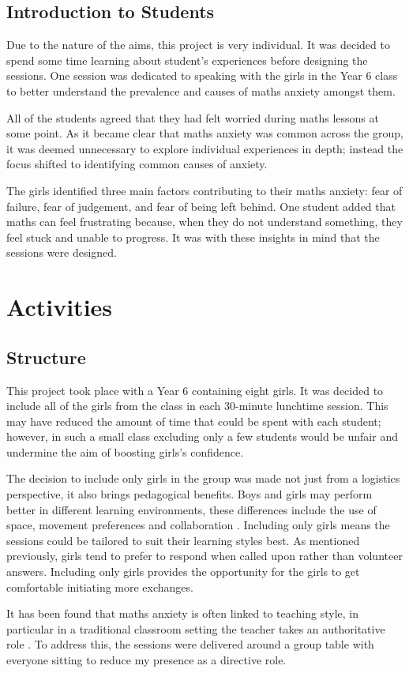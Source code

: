 \documentclass[11pt, a4paper, notitlepage]{article}
\begin{document}
\subsection{Introduction to Students}
Due to the nature of the aims, this project is very individual. It was decided to spend some time learning about student's experiences before designing the sessions. One session was dedicated to speaking with the girls in the Year 6 class to better understand the prevalence and causes of maths anxiety amongst them.
\par
 All of the students agreed that they had felt worried during maths lessons at some point. As it became clear that maths anxiety was common across the group, it was deemed unnecessary to explore individual experiences in depth; instead the focus shifted to identifying common causes of anxiety.
\par
The girls identified three main factors contributing to their maths anxiety: fear of failure, fear of judgement, and fear of being left behind. One student added that maths can feel frustrating because, when they do not understand something, they feel stuck and unable to progress. It was with these insights in mind that the sessions were designed.

\section{Activities}

\subsection{Structure}
This project took place with a Year 6 containing eight girls. It was decided to include all of the girls from the class in each 30-minute lunchtime session. This may have reduced the amount of time that could be spent with each student; however, in such a small class excluding only a few students would be unfair and undermine the aim of boosting girls's confidence.
\par
The decision to include only girls in the group was made not just from a logistics perspective, it also brings pedagogical benefits. Boys and girls may perform better in different learning environments, these differences include the use of space, movement preferences and collaboration \cite{Hughes:2006}. Including only girls means the sessions could be tailored to suit their learning styles best. As mentioned previously, girls tend to prefer to respond when called upon rather than volunteer answers. Including only girls provides the opportunity for the girls to get comfortable initiating more exchanges.
\par 
It has been found that maths anxiety is often linked to teaching style, in particular in a traditional classroom setting the teacher takes an authoritative role \cite{Finlayson:2014}. To address this, the sessions were delivered around a group table with everyone sitting to reduce my presence as a directive role. 
\end{document}
